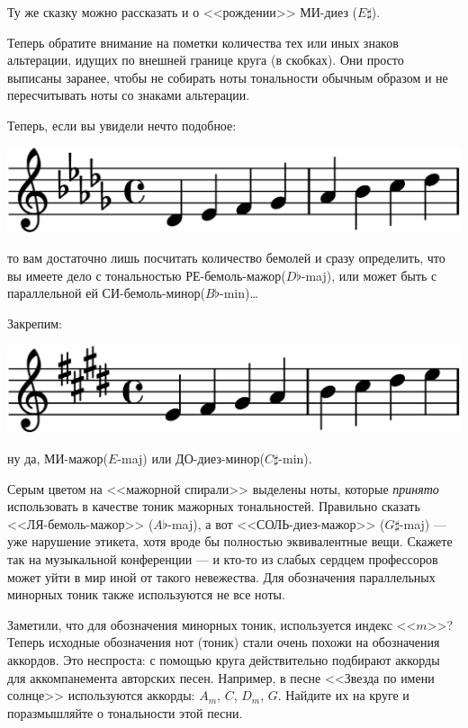 Ту же сказку можно рассказать и о <<рождении>> МИ-диез ($E\sharp$).

Теперь обратите внимание на пометки количества тех или иных знаков альтерации, идущих по внешней границе круга (в скобках). Они просто выписаны заранее, чтобы не собирать ноты тональности обычным образом и не пересчитывать ноты со знаками альтерации.  

Теперь, если вы увидели нечто подобное:

\begin{center}    
    \includegraphics{fig/kvinto-kvarto/tonality-des-maj}
\end{center}

то вам достаточно лишь посчитать количество бемолей и сразу определить, что вы имеете дело с тональностью РЕ-бемоль-мажор($D\flat$-maj), или может быть с параллельной ей СИ-бемоль-минор($B\flat$-min)\ldots

Закрепим:
\begin{center}    
    \includegraphics{fig/kvinto-kvarto/tonality-e-maj}
\end{center}
ну да, МИ-мажор($E$-maj) или ДО-диез-минор($C\sharp$-min).

Серым цветом на <<мажорной спирали>> выделены ноты, которые \emph{принято} использовать в качестве тоник мажорных тональностей. Правильно сказать <<ЛЯ-бемоль-мажор>> ($A\flat$-maj), а вот <<СОЛЬ-диез-мажор>> ($G\sharp$-maj) --- уже нарушение этикета, хотя вроде бы полностью эквивалентные вещи. Скажете так на музыкальной конференции --- и кто-то из слабых сердцем профессоров может уйти в мир иной от такого невежества. Для обозначения параллельных минорных тоник также используются не все ноты.

Заметили, что для обозначения минорных тоник, используется индекс <<$m$>>? Теперь исходные обозначения нот (тоник) стали очень похожи на обозначения аккордов. Это неспроста: с помощью круга действительно подбирают аккорды для аккомпанемента авторских песен. Например, в песне <<Звезда по имени солнце>> используются аккорды: $A_m$, $C$, $D_m$, $G$. Найдите их на круге и поразмышляйте о тональности этой песни.
